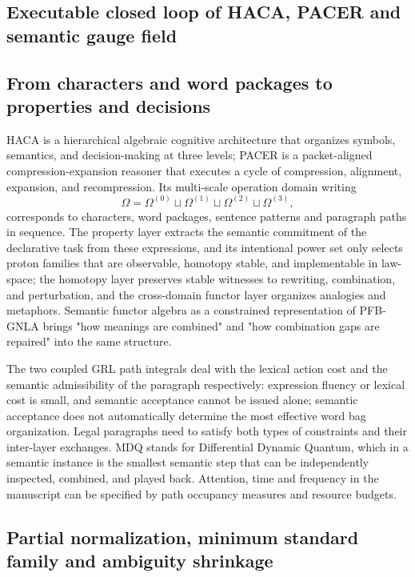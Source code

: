 \documentclass[11pt,a4paper]{article}
\theoremstyle{plain}
\theoremstyle{definition}
\theoremstyle{remark}
\begin{document}
\begin{CJK*}
\section { Executable closed loop of HACA, PACER and semantic gauge field }\label{fa:semantics}


\subsection { From characters and word packages to properties and decisions }

HACA is a hierarchical algebraic cognitive architecture that organizes symbols, semantics, and decision-making at three levels; PACER is a packet-aligned compression-expansion reasoner that executes a cycle of compression, alignment, expansion, and recompression. Its multi-scale operation domain writing \[
 \Omega=\Omega^{(0)}\sqcup\Omega^{(1)}\sqcup
 \Omega^{(2)}\sqcup\Omega^{(3)},
\] corresponds to characters, word packages, sentence patterns and paragraph paths in sequence. The property layer extracts the semantic commitment of the declarative task from these expressions, and its intentional power set only selects proton families that are observable, homotopy stable, and implementable in law-space; the homotopy layer preserves stable witnesses to rewriting, combination, and perturbation, and the cross-domain functor layer organizes analogies and metaphors. Semantic functor algebra as a constrained representation of PFB-GNLA brings "how meanings are combined" and "how combination gaps are repaired" into the same structure. \cite{S04,S11}

The two coupled GRL path integrals deal with the lexical action cost and the semantic admissibility of the paragraph respectively: expression fluency or lexical cost is small, and semantic acceptance cannot be issued alone; semantic acceptance does not automatically determine the most effective word bag organization. Legal paragraphs need to satisfy both types of constraints and their inter-layer exchanges. MDQ stands for Differential Dynamic Quantum, which in a semantic instance is the smallest semantic step that can be independently inspected, combined, and played back. Attention, time and frequency in the manuscript can be specified by path occupancy measures and resource budgets.

\subsection { Partial normalization, minimum standard family and ambiguity shrinkage }


\end{CJK*}
\end{document}
